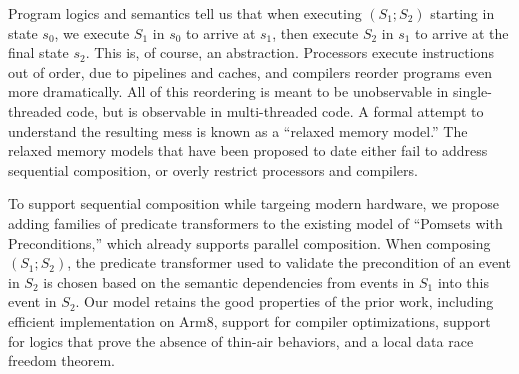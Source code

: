 
Program logics and semantics tell us that when executing $(S_1; S_2)$ starting in state $s_0$,
we execute $S_1$ in $s_0$ to arrive at $s_1$, then execute $S_2$ in $s_1$ to
arrive at the final state $s_2$.  This is, of course, an abstraction.  Processors
execute instructions out of order, due to pipelines and caches, and compilers
reorder programs even more dramatically.  All of this reordering is meant to
be unobservable in single-threaded code, but is observable in multi-threaded code.
A formal attempt to understand the resulting mess is known
as a ``relaxed memory model.''  The relaxed memory models that have been
proposed to date either fail to address sequential composition, or overly
restrict processors and compilers.

To support sequential composition while targeing modern hardware, we propose adding families of predicate
transformers to the existing model of ``Pomsets with Preconditions,'' which
already supports parallel composition.  When composing $(S_1;S_2)$, the predicate
transformer used to validate the precondition of an event in $S_2$ is chosen
based on the semantic dependencies from events in $S_1$ into this event in $S_2$.  Our model
retains the good properties of the prior work, including efficient
implementation on Arm8, support for compiler optimizations, support for
logics that prove the absence of thin-air behaviors, and a local data race
freedom theorem.
